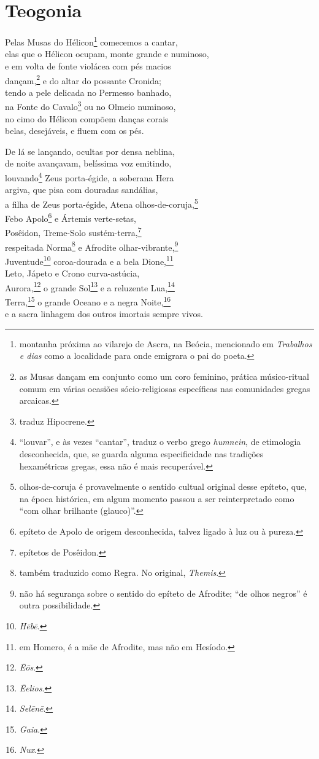 \chapter{Teogonia}

\noindent{}Pelas Musas do Hélicon\footnote{montanha próxima ao vilarejo de Ascra, na Beócia, mencionado
em \emph{Trabalhos e dias} como a localidade para onde emigrara o pai do
poeta.} comecemos a cantar, \\
elas que o Hélicon ocupam, monte grande e numinoso,\\
e em volta de fonte violácea com pés macios\\
dançam,\footnote{as Musas dançam em conjunto como um coro feminino, prática
músico-ritual comum em várias ocasiões sócio-religiosas específicas nas
comunidades gregas arcaicas.} e do altar do possante Cronida;\\
tendo a pele delicada no Permesso banhado,\\
na Fonte do Cavalo\footnote{traduz Hipocrene.} ou no Olmeio numinoso,\\
no cimo do Hélicon compõem danças corais\\
belas, desejáveis, e fluem com os pés.

\quad{}De lá se lançando, ocultas por densa neblina,\\
de noite avançavam, belíssima voz emitindo,\\
louvando\footnote{``louvar'', e às vezes ``cantar'', traduz o verbo grego
\emph{humnein}, de etimologia desconhecida, que, se guarda alguma
especificidade nas tradições hexamétricas gregas, essa não é mais
recuperável.} Zeus porta-égide, a soberana Hera\\
argiva, que pisa com douradas sandálias,\\
a filha de Zeus porta-égide, Atena olhos-de-coruja,\footnote{olhos-de-coruja é provavelmente o sentido cultual original desse
epíteto, que, na época histórica, em algum momento passou a ser
reinterpretado como ``com olhar brilhante (glauco)''.}\\
Febo Apolo\footnote{epíteto de Apolo de origem desconhecida, talvez ligado à luz
ou à pureza.} e Ártemis verte-setas,\\
Posêidon, Treme-Solo sustém-terra,\footnote{epítetos de Posêidon.}\\
respeitada Norma\footnote{também traduzido como Regra. No original, \emph{Themis}.} e Afrodite olhar-vibrante,\footnote{não há segurança sobre o sentido do epíteto de Afrodite; ``de olhos negros'' é outra possibilidade.}\\
Juventude\footnote{\emph{Hēbē}.} coroa-dourada e a bela Dione,\footnote{em Homero, é a mãe de Afrodite, mas não em Hesíodo.}\\
Leto, Jápeto e Crono curva-astúcia,\\
Aurora,\footnote{\emph{Ēōs}.} o grande Sol\footnote{\emph{Ēelios}.} e a reluzente Lua,\footnote{\emph{Selēnē}.}\\
Terra,\footnote{\emph{Gaia}.} o grande Oceano e a negra Noite,\footnote{\emph{Nux}.} \\
e a sacra linhagem dos outros imortais sempre vivos.

